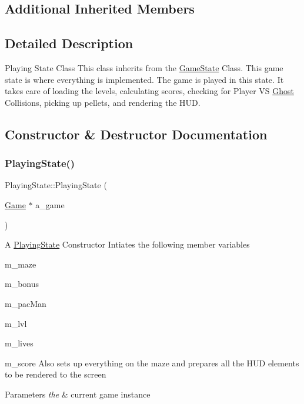 \subsection*{Additional Inherited Members}


\subsection{Detailed Description}
Playing State Class This class inherits from the \hyperlink{class_game_state}{Game\+State} Class. This game state is where everything is implemented. The game is played in this state. It takes care of loading the levels, calculating scores, checking for Player VS \hyperlink{class_ghost}{Ghost} Collisions, picking up pellets, and rendering the H\+UD. 

\subsection{Constructor \& Destructor Documentation}
\mbox{\label{class_playing_state_a09c8d3c87687ffa4e5f04c70265d67de}} 
\subsubsection{\texorpdfstring{Playing\+State()}{PlayingState()}}
{\footnotesize\ttfamily Playing\+State\+::\+Playing\+State (\begin{DoxyParamCaption}\item[{\hyperlink{class_game}{Game} $\ast$}]{a\+\_\+game }\end{DoxyParamCaption})}

A \hyperlink{class_playing_state}{Playing\+State} Constructor Intiates the following member variables
\begin{DoxyItemize}
\item m\+\_\+maze
\item m\+\_\+bonus
\item m\+\_\+pac\+Man
\item m\+\_\+lvl
\item m\+\_\+lives
\item m\+\_\+score Also sets up everything on the maze and prepares all the H\+UD elements to be rendered to the screen 
\begin{DoxyParams}{Parameters}
{\em the} & current game instance \\
\hline
\end{DoxyParams}

\end{DoxyItemize}\mbox{\label{class_playing_state_afd96eb2be532e40c9db2f9607e4ea284}} 
